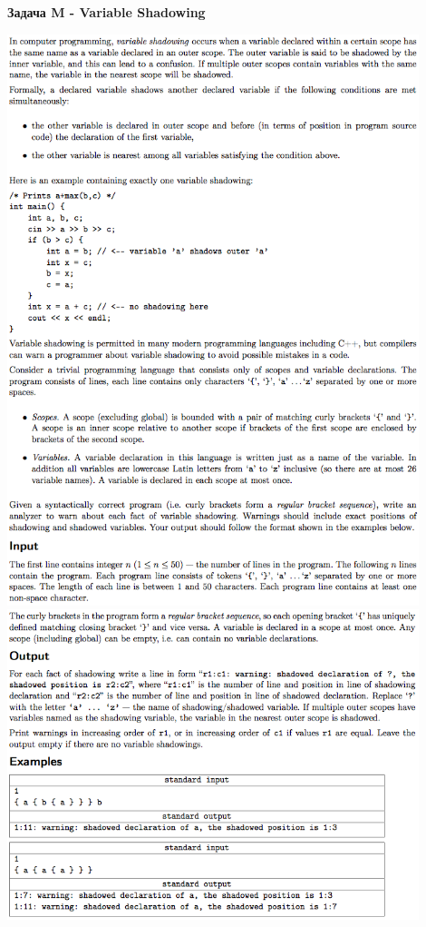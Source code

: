 \documentclass[a4paper,12pt]{article}
\begin{document}
\newpage
\textbf{{\large Задача M - Variable Shadowing}} \\
\begin{center}
\includegraphics[width=0.9\textwidth]{CT_ACM_WEST/CT_ACM_WEST_M1.png}\\ [1cm]
\includegraphics[width=0.9\textwidth]{CT_ACM_WEST/CT_ACM_WEST_M2.png}\\ [1cm]
\end{center}
\end{document}

